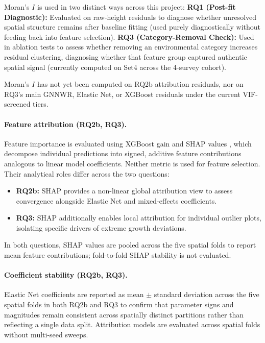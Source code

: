 Moran's $I$ is used in two distinct ways across this project: \textbf{RQ1 (Post-fit Diagnostic):} Evaluated on raw-height residuals to diagnose whether unresolved spatial structure remains after baseline fitting (used purely diagnostically without feeding back into feature selection). \textbf{RQ3 (Category-Removal Check):} Used in ablation tests to assess whether removing an environmental category increases residual clustering, diagnosing whether that feature group captured authentic spatial signal (currently computed on Set4 across the 4-survey cohort).

Moran's $I$ has not yet been computed on RQ2b attribution residuals, nor on RQ3's main GNNWR, Elastic Net, or XGBoost residuals under the current VIF-screened tiers. %

\paragraph*{Feature attribution (RQ2b, RQ3).}
Feature importance is evaluated using XGBoost gain and SHAP values \citep{lundberg2017unified}, which decompose individual predictions into signed, additive feature contributions analogous to linear model coefficients. Neither metric is used for feature selection. Their analytical roles differ across the two questions:
\begin{itemize}
  \item \textbf{RQ2b:} SHAP provides a non-linear global attribution view to assess convergence alongside Elastic Net and mixed-effects coefficients.
  \item \textbf{RQ3:} SHAP additionally enables local attribution for individual outlier plots, isolating specific drivers of extreme growth deviations.
\end{itemize}
In both questions, SHAP values are pooled across the five spatial folds to report mean feature contributions; fold-to-fold SHAP stability is not evaluated.

\paragraph*{Coefficient stability (RQ2b, RQ3).}
Elastic Net coefficients are reported as mean $\pm$ standard deviation across the five spatial folds in both RQ2b and RQ3 to confirm that parameter signs and magnitudes remain consistent across spatially distinct partitions rather than reflecting a single data split. Attribution models are evaluated across spatial folds without multi-seed sweeps.

